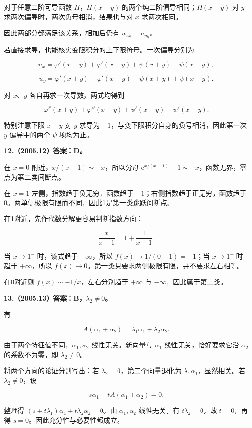 \documentclass[UTF8,11pt,fontset=windows]{ctexart}
\begin{document}
对于任意二阶可导函数 $H$，$H(x+y)$ 的两个纯二阶偏导相同；$H(x-y)$ 对 $y$ 求两次偏导时，两次负号相消，结果也与对 $x$ 求两次相同。

因此两部分都满足该关系，相加后仍有 $u_{xx}=u_{yy}$。

若直接求导，也能核实变限积分的上下限符号。一次偏导分别为

$$
u_x=\varphi'(x+y)+\varphi'(x-y)+\psi(x+y)-\psi(x-y),
$$

$$
u_y=\varphi'(x+y)-\varphi'(x-y)+\psi(x+y)+\psi(x-y).
$$

对 $x$、$y$ 各自再求一次导数，两式均得到

$$
\varphi''(x+y)+\varphi''(x-y)+\psi'(x+y)-\psi'(x-y).
$$

特别注意下限 $x-y$ 对 $y$ 求导为 $-1$，与变下限积分自身的负号相消，因此第一次 $y$ 偏导中的两个 $\psi$ 项均为正。

\clearpage

\textbf{12.（2005.12）答案：D。}

在 $x=0$ 附近，$x/(x-1)\sim-x$，所以分母 $\mathrm e^{x/(x-1)}-1\sim-x$，函数无界，零点为第二类间断点。

在 $x=1$ 左侧，指数趋于负无穷，函数趋于 $-1$；右侧指数趋于正无穷，函数趋于0。两单侧极限有限而不同，因此1是第一类跳跃间断点。

在1附近，先作代数分解更容易判断指数方向：

$$
\frac{x}{x-1}=1+\frac1{x-1}.
$$

当 $x\to1^-$ 时，该式趋于 $-\infty$，所以 $f(x)\to1/(0-1)=-1$；当 $x\to1^+$ 时趋于 $+\infty$，所以 $f(x)\to0$。第一类只要求两侧极限有限，并不要求左右相等。

在0附近则 $f(x)\sim-1/x$，左右分别趋于 $+\infty$ 与 $-\infty$，因此属于第二类。

\clearpage

\textbf{13.（2005.13）答案：B，$\lambda_2\ne0$。}

有

$$
A(\alpha_1+\alpha_2)=\lambda_1\alpha_1+\lambda_2\alpha_2.
$$

由于两个特征值不同，$\alpha_1,\alpha_2$ 线性无关。新向量与 $\alpha_1$ 线性无关，恰好要求它沿 $\alpha_2$ 的系数不为零，即 $\lambda_2\ne0$。

将两个方向的论证分别写出：若 $\lambda_2=0$，第二个向量退化为 $\lambda_1\alpha_1$，显然相关。若 $\lambda_2\ne0$，设

$$
s\alpha_1+tA(\alpha_1+\alpha_2)=0.
$$

整理得 $(s+t\lambda_1)\alpha_1+t\lambda_2\alpha_2=0$。由 $\alpha_1,\alpha_2$ 线性无关，有 $t\lambda_2=0$，故 $t=0$，再得 $s=0$。因此充分性与必要性都成立。
\end{document}
